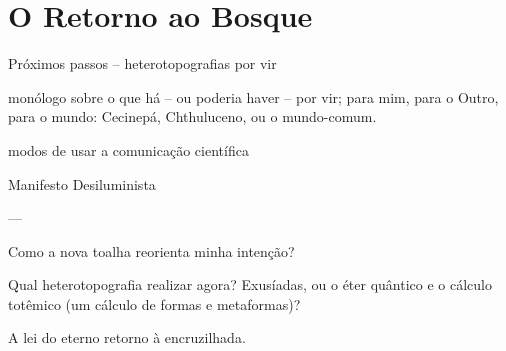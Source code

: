 \chapter{O Retorno ao Bosque}
\label{cap:retorno}

Próximos passos -- heterotopografias por vir

monólogo sobre o que há -- ou poderia haver -- por vir;
    para mim, para o Outro, para o mundo:
        Cecinepá, Chthuluceno, ou o mundo-comum.

modos de usar a comunicação científica

Manifesto Desiluminista

---

Como a nova toalha reorienta minha intenção?

Qual heterotopografia realizar agora? Exusíadas, ou o éter quântico e o cálculo totêmico (um cálculo de formas e metaformas)?

A lei do eterno retorno à encruzilhada.